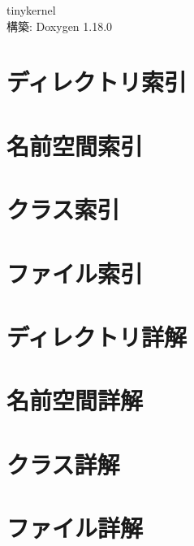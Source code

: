 \documentclass[twoside]{book}
\newenvironment{CJK}[2]{}{}
\newcommand{\+}{\discretionary{\mbox{\scriptsize$\hookleftarrow$}}{}{}}
\newcommand{\clearemptydoublepage}{%
    \newpage{\pagestyle{empty}\cleardoublepage}%
  }
\begin{document}
  \raggedbottom
  \begin{CJK}{UTF8}{min}
  \begin{titlepage}
  \vspace*{7cm}
  \begin{center}%
  {\Large tinykernel}\\
  \vspace*{1cm}
  {\large 構築: Doxygen 1.18.0}\\
  \end{center}
  \end{titlepage}
  \clearemptydoublepage
  \tableofcontents
  \clearemptydoublepage
\chapter{ディレクトリ索引}

\chapter{名前空間索引}

\chapter{クラス索引}

\chapter{ファイル索引}

\chapter{ディレクトリ詳解}






\chapter{名前空間詳解}


\chapter{クラス詳解}









\chapter{ファイル詳解}










  \backmatter
  \newpage
  \clearemptydoublepage
  \printindex
\end{CJK}
\end{document}
